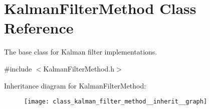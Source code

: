 \hypertarget{class_kalman_filter_method}{\section{\-Kalman\-Filter\-Method \-Class \-Reference}
\label{class_kalman_filter_method}
}


\-The base class for \-Kalman filter implementations.  




{\ttfamily \#include $<$\-Kalman\-Filter\-Method.\-h$>$}



\-Inheritance diagram for \-Kalman\-Filter\-Method\-:\nopagebreak
\begin{figure}[H]
\begin{center}
\leavevmode
\texttt{[image: class\_kalman\_filter\_method\_\_inherit\_\_graph]}
\end{center}
\end{figure}
